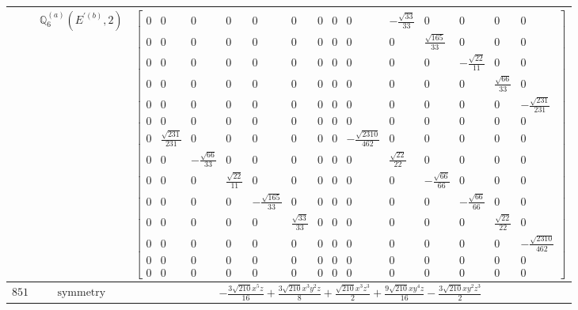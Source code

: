 \documentclass[fleqn,8pt,landscape]{jsarticle}
\begin{document}
\begin{longtable}{ccc}
$  $ & $ \mathbb{Q}_{6}^{(a)}(E^{\prime(b)},2) $ & $ \begin{bmatrix} 0 & 0 & 0 & 0 & 0 & 0 & 0 & 0 & 0 & - \frac{\sqrt{33}}{33} & 0 & 0 & 0 & 0 \\ 0 & 0 & 0 & 0 & 0 & 0 & 0 & 0 & 0 & 0 & \frac{\sqrt{165}}{33} & 0 & 0 & 0 \\ 0 & 0 & 0 & 0 & 0 & 0 & 0 & 0 & 0 & 0 & 0 & - \frac{\sqrt{22}}{11} & 0 & 0 \\ 0 & 0 & 0 & 0 & 0 & 0 & 0 & 0 & 0 & 0 & 0 & 0 & \frac{\sqrt{66}}{33} & 0 \\ 0 & 0 & 0 & 0 & 0 & 0 & 0 & 0 & 0 & 0 & 0 & 0 & 0 & - \frac{\sqrt{231}}{231} \\ 0 & 0 & 0 & 0 & 0 & 0 & 0 & 0 & 0 & 0 & 0 & 0 & 0 & 0 \\ 0 & \frac{\sqrt{231}}{231} & 0 & 0 & 0 & 0 & 0 & 0 & - \frac{\sqrt{2310}}{462} & 0 & 0 & 0 & 0 & 0 \\ 0 & 0 & - \frac{\sqrt{66}}{33} & 0 & 0 & 0 & 0 & 0 & 0 & \frac{\sqrt{22}}{22} & 0 & 0 & 0 & 0 \\ 0 & 0 & 0 & \frac{\sqrt{22}}{11} & 0 & 0 & 0 & 0 & 0 & 0 & - \frac{\sqrt{66}}{66} & 0 & 0 & 0 \\ 0 & 0 & 0 & 0 & - \frac{\sqrt{165}}{33} & 0 & 0 & 0 & 0 & 0 & 0 & - \frac{\sqrt{66}}{66} & 0 & 0 \\ 0 & 0 & 0 & 0 & 0 & \frac{\sqrt{33}}{33} & 0 & 0 & 0 & 0 & 0 & 0 & \frac{\sqrt{22}}{22} & 0 \\ 0 & 0 & 0 & 0 & 0 & 0 & 0 & 0 & 0 & 0 & 0 & 0 & 0 & - \frac{\sqrt{2310}}{462} \\ 0 & 0 & 0 & 0 & 0 & 0 & 0 & 0 & 0 & 0 & 0 & 0 & 0 & 0 \\ 0 & 0 & 0 & 0 & 0 & 0 & 0 & 0 & 0 & 0 & 0 & 0 & 0 & 0 \end{bmatrix} $ \\ \hline
$ 851 $ & $ \text{symmetry} $ & $ - \frac{3 \sqrt{210} x^{5} z}{16} + \frac{3 \sqrt{210} x^{3} y^{2} z}{8} + \frac{\sqrt{210} x^{3} z^{3}}{2} + \frac{9 \sqrt{210} x y^{4} z}{16} - \frac{3 \sqrt{210} x y^{2} z^{3}}{2} $ \\

\end{longtable}
\end{document}
